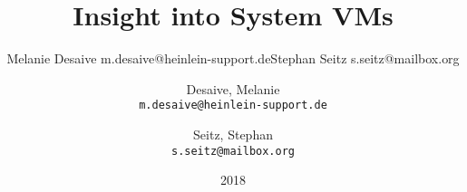 \documentclass[10pt,titlepage]{article}
\begin{document}
\begin{titlepage}
\title{Insight into System VMs}
\date{2018}
\author{Melanie Desaive m.desaive@heinlein-support.de\newline Stephan Seitz s.seitz@mailbox.org}
\author{
  Desaive, Melanie\\
  \texttt{m.desaive@heinlein-support.de}
  \and
  Seitz, Stephan\\
  \texttt{s.seitz@mailbox.org}
}
\maketitle
\end{titlepage}


\tableofcontents

\setcounter{page}{1}

\newpage


\newpage


\newpage


\newpage


\newpage
\listoffigures
{}

\newpage
\listoftables
{}

\newpage
\appendix



\newpage
\nocite{*}


\end{document}
